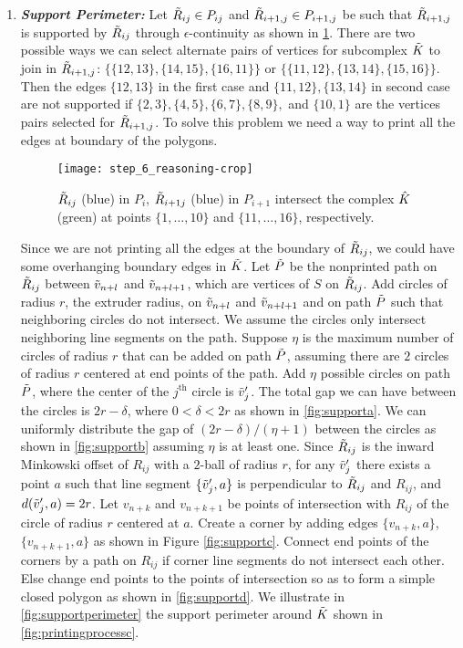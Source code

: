 \begin{enumerate}
  \item\label{itm:support}
    {\bf{\textit{Support Perimeter:}}}
    Let $\tilde{R}_{ij} \in P_{ij}$ and $\tilde{R}_{i+1,j} \in P_{i+1,j}$ be such that $\tilde{R}_{i+1,j}$ is supported by $\tilde{R}_{ij}$ through $\epsilon$-continuity as shown in \cref{fig:step_6_reasoning}.
    There are two possible ways we can select alternate pairs of vertices for subcomplex $\tilde{K}$ to join in $\tilde{R}_{i+1,j}$: $\{\{12, 13\}, \{14, 15\}, \{16, 11\}\}$ or $\{\{11, 12\}, \{13, 14\}, \{15, 16\}\}$. %
    Then the edges $\{12, 13\}$ in the first case and $ \{11, 12\}, \{13, 14\}$ in second case are not supported if $\{2, 3\},\{4, 5\}, \{6, 7\}, \{8, 9\},$ and $\{10, 1\}$ are the vertices pairs selected for $\tilde{R}_{i+1,j}$.
    To solve this problem we need a way to print all the edges at boundary of the polygons.
    \begin{figure}[htp!] 
  	\centering
  	\texttt{[image: step\_6\_reasoning-crop]}
  	\caption{\label{fig:step_6_reasoning}
          $\tilde{R}_{ij}$ (blue) in $P_i$, $\tilde{R}_{i+1j}$ (blue) in $P_{i + 1}$ intersect the complex $\hat{K}$ (green) at points $\{1, \dots,10\}$ and $\{11, \dots, 16\}$, respectively.
        }
    \end{figure}  
  
    Since we are not printing all the edges at the boundary of $\tilde{R}_{ij}$, we could have some overhanging boundary edges in $\tilde{K}$.
    Let $\tilde{P}$ be the nonprinted path on $\tilde{R}_{ij}$ between $\tilde{v}_{n + l}$ and  $\tilde{v}_{n+l+1}$, which are vertices of $S$ on $\tilde{R}_{ij}$.
    Add circles of radius $r$, the extruder radius, on $\tilde{v}_{n+l}$ and $\tilde{v}_{n+l+1}$ and on path $\tilde{P}$ such that neighboring circles do not intersect.
    We assume the circles only intersect neighboring line segments on the path.
    Suppose $\eta$ is the maximum number of circles of radius $r$ that can be added on path $\tilde{P}$, assuming there are $2$ circles of radius $r$ centered at end points of the path.
    Add $\eta$ possible circles on path $\tilde{P}$, where the center of the $j^{\mbox{th}}$ circle is $\tilde{v}'_j$.
    The total gap we can have between the circles is $2r - \delta$, where $0 < \delta < 2r$ as shown in \cref{fig:supporta}.
    We can uniformly distribute the gap of $(2r - \delta)/(\eta + 1)$ between the circles as shown in \cref{fig:supportb} assuming $\eta$ is at least one.
    Since $\tilde{R}_{ij}$ is the inward Minkowski offset of $R_{ij}$ with a $2$-ball of radius $r$, for any $\tilde{v}'_j$ there exists a point $a$ such that line segment $\{\tilde{v}'_j, a\}$ is perpendicular to $\tilde{R}_{ij}$ and $R_{ij}$, and  $d(\tilde{v}'_j, a) = 2r$.
    Let $v_{n+k}$ and $v_{n+k+1}$ be points of intersection with $R_{ij}$ of the circle of radius $r$ centered at $a$.
    Create a corner by adding edges $\{v_{n+k}, a\}$, $\{v_{n +k +1}, a\}$ as shown in Figure \ref{fig:supportc}.
    Connect end points of the corners by a path on $R_{ij}$ if corner line segments do not intersect each other.
    Else change end points to the points of intersection so as to form a simple closed polygon as shown in \cref{fig:supportd}.
    We illustrate in \cref{fig:supportperimeter} the support perimeter around $\tilde{K}$ shown in \cref{fig:printingprocessc}.
    

\end{enumerate}
